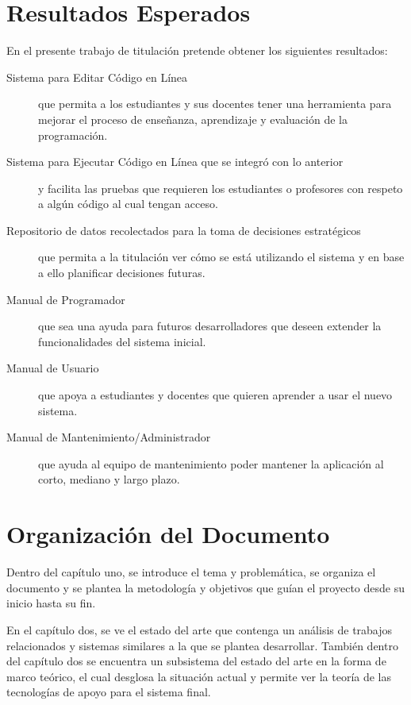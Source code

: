 \section{Resultados Esperados}
En el presente trabajo de titulación pretende obtener los siguientes resultados:
\begin{description}
	\item[Sistema para Editar Código en Línea] que permita a los estudiantes y sus docentes tener una herramienta para mejorar el proceso de enseñanza, aprendizaje y evaluación de la programación.   
 \item[Sistema para Ejecutar Código en Línea que se integró con lo anterior] y facilita las pruebas que requieren los estudiantes o profesores con respeto a algún código al cual tengan acceso. 
 \item[Repositorio de datos recolectados para la toma de decisiones estratégicos] que permita a la titulación ver cómo se está utilizando el sistema y en base a ello planificar decisiones futuras.  
 \item[Manual de Programador] que sea una ayuda para futuros desarrolladores que deseen extender la funcionalidades del sistema inicial.
 \item[Manual de Usuario] que apoya a estudiantes y docentes que quieren aprender a usar el nuevo sistema.
 \item[Manual de Mantenimiento/Administrador] que ayuda al equipo de mantenimiento poder mantener la aplicación al corto, mediano y largo plazo.
\end{description}

\section{Organización del Documento}
Dentro del capítulo uno, se introduce el tema y problemática, se organiza el documento y se plantea la metodología y objetivos que guían el proyecto desde su inicio hasta su fin.
 
En el capítulo dos, se ve el estado del arte que contenga un análisis de trabajos relacionados y sistemas similares a la que se plantea desarrollar. También dentro del capítulo dos se encuentra un subsistema del estado del arte en la forma de marco teórico, el cual desglosa la situación actual y permite ver la teoría de las tecnologías de apoyo para el sistema final.
 
